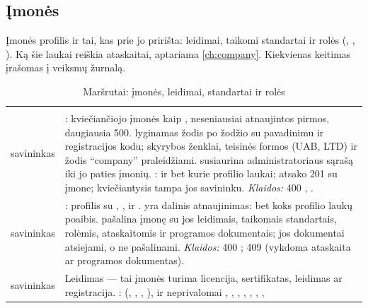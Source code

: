 \subsection{Įmonės}\label{sec:api:companies}

Įmonės profilis ir tai, kas prie jo pririšta: leidimai, taikomi standartai ir rolės
(, ,
). Ką šie laukai reiškia ataskaitai, aptariama \cref{ch:company}.
Kiekvienas keitimas įrašomas į veiksmų žurnalą.

\begin{xltabular}{\textwidth}{@{}L{19mm}Y@{}}
\caption{Maršrutai: įmonės, leidimai, standartai ir rolės}\label{tab:api:companies}\\
\toprule {} &  \\ \midrule \endfirsthead
\toprule {} &  \\ \midrule \endhead
\bottomrule \endlastfoot
{}
savininkas & : kviečiančiojo įmonės kaip , neseniausiai atnaujintos
  pirmos, daugiausia 500.  lyginamas žodis po žodžio su pavadinimu ir registracijos kodu;
  skyrybos ženklai, teisinės formos (UAB, LTD) ir žodis \enquote{company} praleidžiami.
   susiaurina administratoriaus sąrašą iki jo paties įmonių. :
   ir bet kurie profilio laukai; atsako 201 su įmone; kviečiantysis tampa jos
  savininku. \emph{Klaidos:} 400 , . \\
\addlinespace
{}
savininkas & : profilis su , ,  ir
  .  yra dalinis atnaujinimas: bet koks profilio laukų poaibis.
   pašalina įmonę su jos leidimais, taikomais standartais, rolėmis, ataskaitomis ir
  programos dokumentais; jos dokumentai atsiejami, o ne pašalinami. \emph{Klaidos:} 400
  ; 409  (vykdoma ataskaita ar programos dokumentas). \\
\addlinespace
{}
savininkas & Leidimas --- tai įmonės turima licencija, sertifikatas, leidimas ar registracija.
  :  (, , ,
  ),  ir neprivalomai , ,
  , , , , ,

\end{xltabular}
